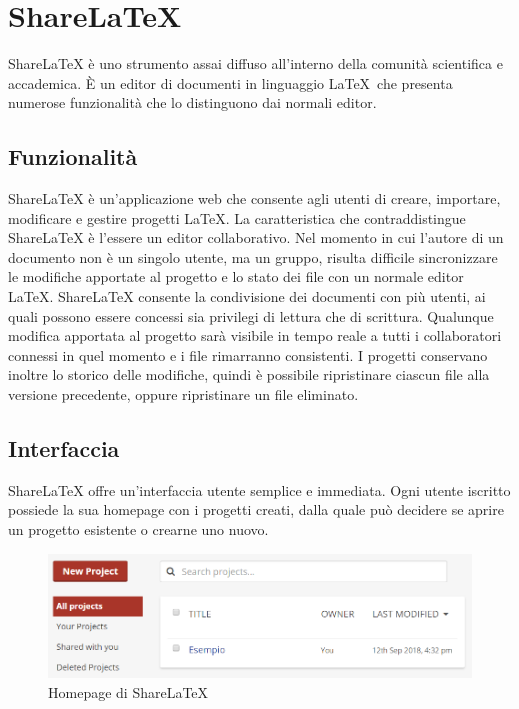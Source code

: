 \chapter{ShareLaTeX}
\label{ShareLaTeX}
\thispagestyle{plain}

ShareLaTeX è uno strumento assai diffuso all'interno della comunità scientifica e accademica. È un editor di documenti in linguaggio \LaTeX ~che presenta numerose funzionalità che lo distinguono dai normali editor.

\section{Funzionalità}

ShareLaTeX è un'applicazione web che consente agli utenti di creare, importare, modificare e gestire progetti \LaTeX. La caratteristica che contraddistingue ShareLaTeX è l'essere un editor collaborativo. Nel momento in cui l'autore di un documento non è un singolo utente, ma un gruppo, risulta difficile sincronizzare le modifiche apportate al progetto e lo stato dei file con un normale editor \LaTeX. ShareLaTeX consente la condivisione dei documenti con più utenti, ai quali possono essere concessi sia privilegi di lettura che di scrittura. Qualunque modifica apportata al progetto sarà visibile in tempo reale a tutti i collaboratori connessi in quel momento e i file rimarranno consistenti. I progetti conservano inoltre lo storico delle modifiche, quindi è possibile ripristinare ciascun file alla versione precedente, oppure ripristinare un file eliminato.

\section{Interfaccia}
ShareLaTeX offre un'interfaccia utente semplice e immediata. Ogni utente iscritto possiede la sua homepage con i progetti creati, dalla quale può decidere se aprire un progetto esistente o crearne uno nuovo.
\begin{figure}[h]
    \centering
    \includegraphics[width=\textwidth]{immagini/homepage.PNG}
    \caption{Homepage di ShareLaTeX}
    \label{fig:sharelatex_homepage}
\end{figure}

